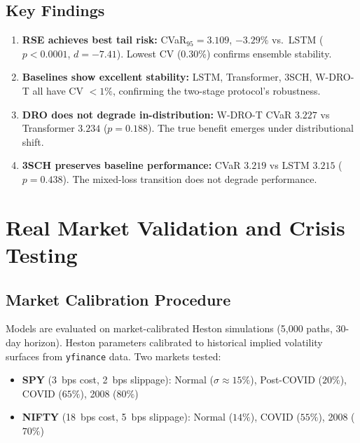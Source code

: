 \documentclass[11pt,oneside]{report}
\begin{document}

\section{Key Findings}

\begin{enumerate}[noitemsep,leftmargin=*]
    \item \textbf{RSE achieves best tail risk:} CVaR$_{95} = 3.109$, $-3.29\%$ vs.\ LSTM ($p < 0.0001$, $d = -7.41$). Lowest CV (0.30\%) confirms ensemble stability.
    \item \textbf{Baselines show excellent stability:} LSTM, Transformer, 3SCH, W-DRO-T all have CV $< 1\%$, confirming the two-stage protocol's robustness.
    \item \textbf{DRO does not degrade in-distribution:} W-DRO-T CVaR $3.227$ vs Transformer $3.234$ ($p = 0.188$). The true benefit emerges under distributional shift.
    \item \textbf{3SCH preserves baseline performance:} CVaR $3.219$ vs LSTM $3.215$ ($p = 0.438$). The mixed-loss transition does not degrade performance.
\end{enumerate}

\chapter{Real Market Validation and Crisis Testing}
\label{sec:crisis}

\section{Market Calibration Procedure}

Models are evaluated on market-calibrated Heston simulations (5,000 paths, 30-day horizon). Heston parameters calibrated to historical implied volatility surfaces from \texttt{yfinance} data. Two markets tested:
\begin{itemize}[noitemsep]
    \item \textbf{SPY} (3~bps cost, 2~bps slippage): Normal ($\sigma \approx 15\%$), Post-COVID ($20\%$), COVID ($65\%$), 2008 ($80\%$)
    \item \textbf{NIFTY} (18~bps cost, 5~bps slippage): Normal ($14\%$), COVID ($55\%$), 2008 ($70\%$)
\end{itemize}
\end{document}
